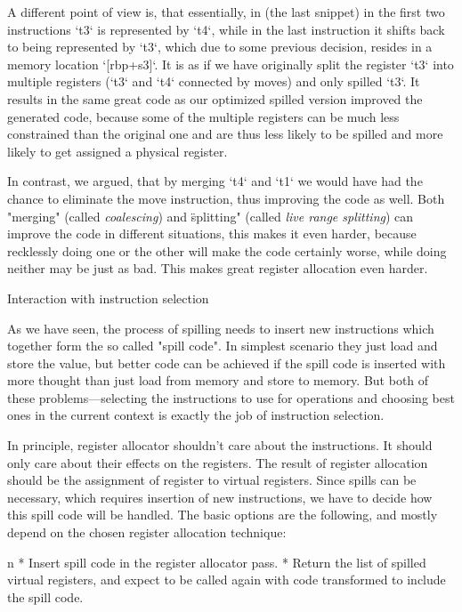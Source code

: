 A different point of view is, that essentially, in (the last snippet)
in the first two instructions `t3` is represented by `t4`, while in the last
instruction it shifts back to being represented by `t3`, which due to some
previous decision, resides in a memory location `[rbp+s3]`. It is as if we have
originally split the register `t3` into multiple registers (`t3` and `t4`
connected by moves) and only spilled `t3`. It results in the same great code as
our optimized spilled version improved the generated code, because some of the
multiple registers can be much less constrained than the original one and are
thus less likely to be spilled and more likely to get assigned a physical
register.

In contrast, we argued, that by merging `t4` and `t1` we would have had the
chance to eliminate the move instruction, thus improving the code as well. Both
"merging" (called {\em coalescing}) and \"splitting" (called {\em live range
splitting}) can improve the code in different situations, this makes it
even harder, because recklessly doing one or the other will make the code
certainly worse, while doing neither may be just as bad. This makes great register
allocation even harder.

\seccc Interaction with instruction selection

As we have seen, the process of spilling needs to insert new instructions which
together form the so called "spill code". In simplest scenario they just load
and store the value, but better code can be achieved if the spill code is
inserted with more thought than just load from memory and store to memory. But
both of these problems---selecting the instructions to use for operations and
choosing best ones in the current context is exactly the job of instruction
selection.

In principle, register allocator shouldn't care about the instructions. It
should only care about their effects on the registers. The result of register
allocation should be the assignment of register to virtual registers. Since spills
can be necessary, which requires insertion of new instructions, we have to
decide how this spill code will be handled. The basic options are the following,
and mostly depend on the chosen register allocation technique:

\begitems\style n
* Insert spill code in the register allocator pass.
* Return the list of spilled virtual registers, and expect to be called again with
code transformed to include the spill code.
\enditems

